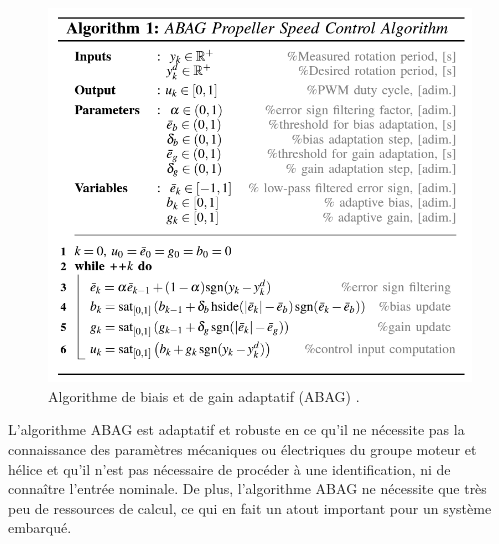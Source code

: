 \begin{figure}[ht!]
    \centerline{
    \includegraphics[trim=0cm 0cm 0cm 0cm,clip,width=0.6\columnwidth]{figures/ABAG_algo.png}}
    \caption{Algorithme de biais et de gain adaptatif (ABAG) \cite{franchi2017}.}
    \label{fig:ABAG_algo}
\end{figure}
L'algorithme ABAG est adaptatif et robuste en ce qu'il ne nécessite pas la connaissance des paramètres mécaniques ou électriques du groupe moteur et hélice et qu'il n'est pas nécessaire de procéder à une identification, ni de connaître l'entrée nominale. De plus, l'algorithme ABAG ne nécessite que très peu de ressources de calcul, ce qui en fait un atout important pour un système embarqué.

 